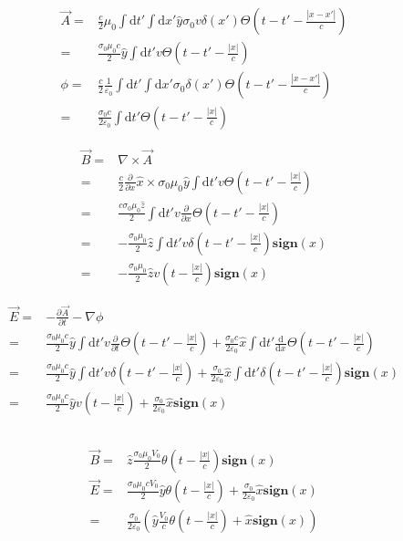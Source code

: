 \documentclass[10pt,fleqn]{article}
\newcommand{\ud}{\mathrm{d}}
\newcommand{\eqar}[1]
{
  \begin{align*}
    #1
  \end{align*}
}
\newcommand{\paren}[1]{{\left({#1}\right)}}
\newcommand{\abs}[1]{{\left|{#1}\right|}}
\newcommand{\pdiff}[3][{}]{{\frac{\partial^{#1} {#2}}{\partial {#3}{}^{#1}}}}
\newcommand{\diff}[3][{}]{{\frac{\ud^{#1} {#2}}{\ud {#3}{}^{#1}}}}
\begin{document}
\subsection{}
\eqar{
  \vec A=&\frac{c}2\mu_0\int\ud t'\int\ud x'\hat y\sigma_0 v\delta(x')\Theta\paren{t-t'-\frac{\abs{x-x'}}{c}}\\
  =&\frac{\sigma_0\mu_0c}2\hat y\int\ud t'v\Theta\paren{t-t'-\frac{\abs{x}}{c}}\\
  \phi=&\frac{c}2\frac{1}{\varepsilon_0}\int\ud t'\int\ud x'\sigma_0\delta(x')\Theta\paren{t-t'-\frac{\abs{x-x'}}{c}}\\
  =&\frac{\sigma_0c}{2\varepsilon_0}\int\ud t'\Theta\paren{t-t'-\frac{\abs{x}}{c}}
}
\eqar{
  \vec B=&\nabla\times\vec A\\
  =&\frac{c}2\pdiff{}{x}\hat x\times\sigma_0\mu_0\hat y\int\ud t'v\Theta\paren{t-t'-\frac{\abs{x}}{c}}\\
  =&\frac{c\sigma_0\mu_0\hat z}{2}\int\ud t'v\pdiff{}{x}\Theta\paren{t-t'-\frac{\abs{x}}{c}}\\
  =&-\frac{\sigma_0\mu_0}{2}\hat z\int\ud t'v\delta\paren{t-t'-\frac{\abs{x}}{c}}\mathbf{sign}\paren{x}\\
  =&-\frac{\sigma_0\mu_0}{2}\hat zv\paren{t-\frac{\abs{x}}{c}}\mathbf{sign}\paren{x}
}
\eqar{
  \vec E=&-\pdiff{\vec A}{t}-\nabla\phi\\
  =&\frac{\sigma_0\mu_0c}2\hat y\int\ud t'v\pdiff{}{t}\Theta\paren{t-t'-\frac{\abs{x}}{c}}+\frac{\sigma_0c}{2\varepsilon_0}\hat x\int\ud t'\diff{}{x}\Theta\paren{t-t'-\frac{\abs{x}}{c}}\\
  =&\frac{\sigma_0\mu_0c}2\hat y\int\ud t'v\delta\paren{t-t'-\frac{\abs{x}}{c}}+\frac{\sigma_0}{2\varepsilon_0}\hat x\int\ud t'\delta\paren{t-t'-\frac{\abs{x}}{c}}\mathbf{sign}\paren{x}\\
  =&\frac{\sigma_0\mu_0c}2\hat yv\paren{t-\frac{\abs{x}}{c}}+\frac{\sigma_0}{2\varepsilon_0}\hat x\mathbf{sign}\paren{x}
}
\subsection{}
\eqar{
  \vec B=&\hat z\frac{\sigma_0\mu_0V_0}{2}\theta\paren{t-\frac{\abs{x}}{c}}\mathbf{sign}\paren{x}\\
  \vec E=&\frac{\sigma_0\mu_0cV_0}2\hat y\theta\paren{t-\frac{\abs{x}}{c}}+\frac{\sigma_0}{2\varepsilon_0}\hat x\mathbf{sign}\paren{x}\\
  =&\frac{\sigma_0}{2\varepsilon_0}\paren{\hat y\frac{V_0}{c}\theta\paren{t-\frac{\abs{x}}{c}}+\hat x\mathbf{sign}\paren{x}}
}
\end{document}
